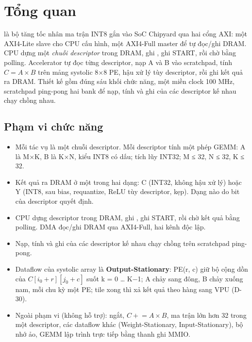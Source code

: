 \section{Tổng quan}\label{sec:1}

\begin{keypoint}
 là bộ tăng tốc nhân ma trận INT8 gắn vào SoC Chipyard qua hai cổng AXI: một
AXI4-Lite slave cho CPU cấu hình, một AXI4-Full master để tự đọc/ghi DRAM. CPU dựng một
\emph{chuỗi descriptor} trong DRAM, ghi , ghi START, rồi chờ bằng polling. Accelerator
tự đọc từng descriptor, nạp A và B vào scratchpad, tính $C = A \times B$ trên mảng systolic 8×8 PE,
hậu xử lý tùy descriptor, rồi ghi kết quả ra DRAM. Thiết kế gồm đúng sáu khối chức năng, một miền
clock  100 MHz, scratchpad ping-pong hai bank để nạp, tính và ghi của các descriptor kế
nhau chạy chồng nhau.
\end{keypoint}

\subsection{Phạm vi chức năng}\label{sec:1.1}
\begin{itemize}
\item Mỗi tác vụ là một chuỗi descriptor. Mỗi descriptor tính một phép GEMM: A là M×K, B là K×N, kiểu INT8 có dấu; tích lũy INT32; M ≤ 32, N ≤ 32, K ≤ 32.
\item Kết quả ra DRAM ở một trong hai dạng: C (INT32, không hậu xử lý) hoặc Y (INT8, sau bias, requantize, ReLU tùy descriptor, kẹp). Dạng nào do bit  của descriptor quyết định.
\item CPU dựng descriptor trong DRAM, ghi , ghi START, rồi chờ kết quả bằng polling. DMA đọc/ghi DRAM qua AXI4-Full, hai kênh độc lập.
\item Nạp, tính và ghi của các descriptor kế nhau chạy chồng trên scratchpad ping-pong.
\item Dataflow của systolic array là \textbf{Output-Stationary}: PE(r, c) giữ bộ cộng dồn của $C[i_0+r][j_0+c]$ suốt k = 0 … K−1; A chảy sang đông, B chảy xuống nam, mỗi chu kỳ một PE; tile xong thì xả kết quả theo hàng sang VPU (D-30).
\item Ngoài phạm vi (không hỗ trợ): ngắt, $C \mathrel{+}= A \times B$, ma trận lớn hơn 32 trong một descriptor, các dataflow khác (Weight-Stationary, Input-Stationary), bộ nhớ ảo, GEMM lập trình trực tiếp bằng thanh ghi MMIO.
\end{itemize}

